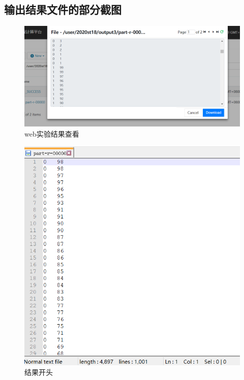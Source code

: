 \documentclass[a4paper,UTF8]{article}
\numberwithin{equation}{section}
\begin{document}
\subsection{输出结果文件的部分截图}
\begin{figure}[H]
	\centering
	\includegraphics[width = 15cm]{res0.PNG}
	\caption{web实验结果查看}
\end{figure}
\begin{figure}[H]
	\centering
	\includegraphics[width = 15cm]{res1.PNG}
	\caption{结果开头}
\end{figure}
\end{document}
